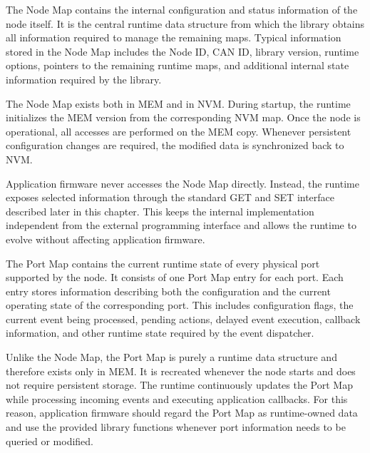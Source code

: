 
The Node Map contains the internal configuration and status information of the 
node itself. It is the central runtime data structure from which the library 
obtains all information required to manage the remaining maps. Typical 
information stored in the Node Map includes the Node ID, CAN ID, library 
version, runtime options, pointers to the remaining runtime maps, and additional 
internal state information required by the library.

The Node Map exists both in MEM and in NVM. During startup, the runtime 
initializes the MEM version from the corresponding NVM map. Once the node is 
operational, all accesses are performed on the MEM copy. Whenever persistent 
configuration changes are required, the modified data is synchronized back to NVM.

Application firmware never accesses the Node Map directly. Instead, the runtime 
exposes selected information through the standard GET and SET interface described 
later in this chapter. This keeps the internal implementation independent from 
the external programming interface and allows the runtime to evolve without 
affecting application firmware.


The Port Map contains the current runtime state of every physical port supported 
by the node. It consists of one Port Map entry for each port. Each entry stores 
information describing both the configuration and the current operating state 
of the corresponding port. This includes configuration flags, the current event 
being processed, pending actions, delayed event execution, callback information, 
and other runtime state required by the event dispatcher.

Unlike the Node Map, the Port Map is purely a runtime data structure and therefore 
exists only in MEM. It is recreated whenever the node starts and does not require 
persistent storage. The runtime continuously updates the Port Map while processing 
incoming events and executing application callbacks. For this reason, application 
firmware should regard the Port Map as runtime-owned data and use the provided 
library functions whenever port information needs to be queried or modified.


